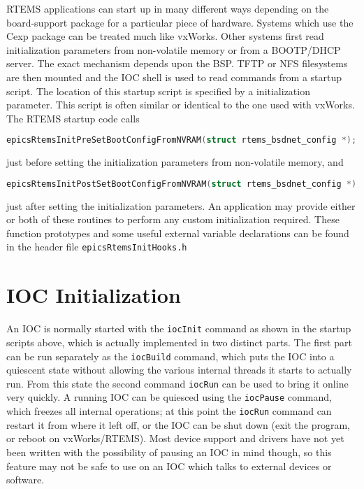 RTEMS applications can start up in many different ways depending on the board-support package for a particular piece of hardware.
Systems which use the Cexp package can be treated much like vxWorks.
Other systems first read initialization parameters from non-volatile memory or from a BOOTP/DHCP server.
The exact mechanism depends upon the BSP.
TFTP or NFS filesystems are then mounted and the IOC shell is used to read commands from a startup script.
The location of this startup script is specified by a initialization parameter.
This script is often similar or identical to the one used with vxWorks.
The RTEMS startup code calls

\begin{lstlisting}[language=C]
epicsRtemsInitPreSetBootConfigFromNVRAM(struct rtems_bsdnet_config *);
\end{lstlisting}

just before setting the initialization parameters from non-volatile memory, and

\begin{lstlisting}[language=C]
epicsRtemsInitPostSetBootConfigFromNVRAM(struct rtems_bsdnet_config *);
\end{lstlisting}

just after setting the initialization parameters.
An application may provide either or both of these routines to perform any custom initialization required.
These function prototypes and some useful external variable declarations can be found in the header file \verb|epicsRtemsInitHooks.h|

\section{IOC Initialization}

An IOC is normally started with the \verb|iocInit| command as shown in the startup scripts above, which is actually implemented in two distinct parts.
The first part can be run separately as the \verb|iocBuild| command, which puts the IOC into a quiescent state without allowing the various internal threads it starts to actually run.
From this state the second command \verb|iocRun| can be used to bring it online very quickly.
A running IOC can be quiesced using the \verb|iocPause| command, which freezes all internal operations; at this point the \verb|iocRun| command can restart it from where it left off, or the IOC can be shut down (exit the program, or reboot on vxWorks/RTEMS).
Most device support and drivers have not yet been written with the possibility of pausing an IOC in mind though, so this feature may not be safe to use on an IOC which talks to external devices or software.

